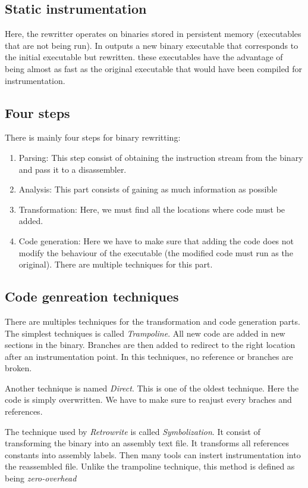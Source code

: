 \documentclass[a4paper,11pt,oneside]{report}
\begin{document}
\subsection{Static instrumentation}
Here, the rewritter operates on binaries stored in persistent memory
(executables that are not being run). In outputs a new binary executable that
corresponds to the initial executable but rewritten. these executables have the
advantage of being almost as fast as the original executable that would have
been compiled for instrumentation.
\subsection{Four steps}
There is mainly four steps for binary rewritting:
\begin{enumerate}
    \item Parsing:
         This step consist of obtaining the instruction stream from the binary
         and pass it to a disassembler.
    \item Analysis:
        This part consists of gaining as much information as possible
    \item Transformation:
        Here, we must find all the locations where  code must be added. 
    \item Code generation:
        Here we have to make sure that adding the code does not modify the
        behaviour of the executable (the modified code must run as the
        original). There are multiple techniques for this part.
\end{enumerate}
\subsection{Code genreation techniques}
There are multiples techniques for the transformation and code generation
parts. The simplest techniques is called \textit{Trampoline}. All new code are
added in new sections in the binary. Branches are then added to redirect to the
right location after an instrumentation point. In this techniques, no reference
or branches are broken.

Another technique is named \textit{Direct}. This is one of the oldest
technique. Here the code is simply overwritten. We have to make sure to reajust
every braches and references.


The technique used by \textit{Retrowrite} is called \textit{Symbolization}. It
consist of transforming the binary into an assembly text file. It transforms
all references constants into assembly labels. Then many tools can instert
instrumentation into the reassembled file. Unlike the trampoline technique,
this method is defined as being \textit{zero-overhead}
\end{document}
